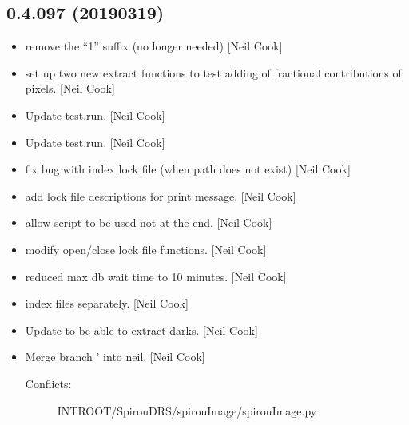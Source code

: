 \documentclass[a4paper,10pt,english]{report}
\begin{document}
\subsection{0.4.097 (2019\sphinxhyphen{}03\sphinxhyphen{}19)}
\label{\detokenize{misc/changelog:id182}}\begin{itemize}
\item {} 
 \sphinxhyphen{} remove the “1” suffix (no longer needed) {[}Neil
Cook{]}

\item {} 
 \sphinxhyphen{} set up two new extract functions to test adding of
fractional contributions of pixels. {[}Neil Cook{]}

\item {} 
Update test.run. {[}Neil Cook{]}

\item {} 
Update test.run. {[}Neil Cook{]}

\item {} 
 \sphinxhyphen{} fix bug with index lock file (when path does not
exist) {[}Neil Cook{]}

\item {} 
 \sphinxhyphen{} add lock file descriptions for print message. {[}Neil
Cook{]}

\item {} 
 \sphinxhyphen{} allow  script to be used not at the end.
{[}Neil Cook{]}

\item {} 
 \sphinxhyphen{} modify open/close lock file functions. {[}Neil Cook{]}

\item {} 
 \sphinxhyphen{} reduced max db wait time to 10 minutes.
{[}Neil Cook{]}

\item {} 
 \sphinxhyphen{} index files separately. {[}Neil Cook{]}

\item {} 
Update  to be able to extract darks. {[}Neil Cook{]}

\item {} 
Merge branch ’ into neil. {[}Neil Cook{]}
\begin{description}
\item[{Conflicts:}] \leavevmode
INTROOT/SpirouDRS/spirouImage/spirouImage.py


\end{description}
\end{itemize}
\end{document}
